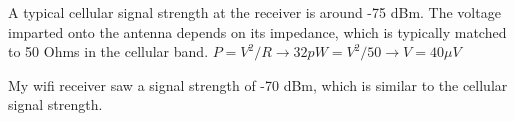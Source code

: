 \documentclass[11pt]{article}
\begin{document}
A typical cellular signal strength at the receiver is around -75 dBm. The voltage imparted onto the antenna depends on its impedance, which is typically matched to 50 Ohms in the cellular band. $P = V^2 / R \rightarrow 32pW = V^2 / 50 \rightarrow V = 40 \mu V$

My wifi receiver saw a signal strength of -70 dBm, which is similar to the cellular signal strength.

\section{}
\end{document}

